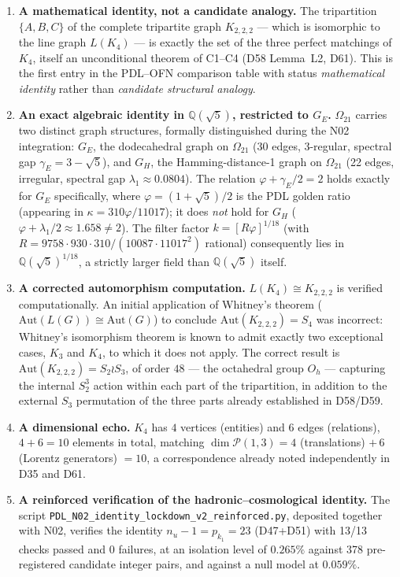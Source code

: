 \documentclass[11pt,a4paper]{article}
\theoremstyle{plain}
\theoremstyle{definition}
\theoremstyle{remark}
\newcommand{\Kfour}{K_4}
\begin{document}
\begin{enumerate}[label=(\roman*)]
\item \textbf{A mathematical identity, not a candidate analogy.} The tripartition $\{A,B,C\}$ of the complete tripartite graph $K_{2,2,2}$ --- which is isomorphic to the line graph $L(\Kfour)$ --- is exactly the set of the three perfect matchings of $\Kfour$, itself an unconditional theorem of C1--C4 (D58 Lemma~L2, D61). This is the first entry in the PDL--OFN comparison table with status \emph{mathematical identity} rather than \emph{candidate structural analogy}.
\item \textbf{An exact algebraic identity in $\mathbb{Q}(\sqrt{5})$, restricted to $G_E$.} $\Omega_{21}$ carries two distinct graph structures, formally distinguished during the N02 integration: $G_E$, the dodecahedral graph on $\Omega_{21}$ (30 edges, 3-regular, spectral gap $\gamma_E=3-\sqrt5$), and $G_H$, the Hamming-distance-1 graph on $\Omega_{21}$ (22 edges, irregular, spectral gap $\lambda_1\approx0.0804$). The relation $\varphi+\gamma_E/2=2$ holds exactly for $G_E$ specifically, where $\varphi=(1+\sqrt5)/2$ is the PDL golden ratio (appearing in $\kappa=310\varphi/11017$); it does \emph{not} hold for $G_H$ ($\varphi+\lambda_1/2\approx1.658\neq2$). The filter factor $k=[R\varphi]^{1/18}$ (with $R=9758\cdot930\cdot310/(10087\cdot11017^2)$ rational) consequently lies in $\mathbb{Q}(\sqrt{5})^{1/18}$, a strictly larger field than $\mathbb{Q}(\sqrt{5})$ itself.
\item \textbf{A corrected automorphism computation.} $L(\Kfour) \cong K_{2,2,2}$ is verified computationally. An initial application of Whitney's theorem ($\mathrm{Aut}(L(G))\cong\mathrm{Aut}(G)$) to conclude $\mathrm{Aut}(K_{2,2,2})=S_4$ was incorrect: Whitney's isomorphism theorem is known to admit exactly two exceptional cases, $K_3$ and $K_4$, to which it does not apply. The correct result is $\mathrm{Aut}(K_{2,2,2}) = S_2\wr S_3$, of order $48$ --- the octahedral group $O_h$ --- capturing the internal $S_2^3$ action within each part of the tripartition, in addition to the external $S_3$ permutation of the three parts already established in D58/D59.
\item \textbf{A dimensional echo.} $\Kfour$ has $4$ vertices (entities) and $6$ edges (relations), $4+6=10$ elements in total, matching $\dim\mathcal{P}(1,3) = 4$ (translations) $+\,6$ (Lorentz generators) $=10$, a correspondence already noted independently in D35 and D61.
\item \textbf{A reinforced verification of the hadronic--cosmological identity.} The script \texttt{PDL\_N02\_identity\_lockdown\_v2\_reinforced.py}, deposited together with N02, verifies the identity $n_u-1=p_{k_1}=23$ (D47+D51) with 13/13 checks passed and 0 failures, at an isolation level of $0.265\%$ against 378 pre-registered candidate integer pairs, and against a null model at $0.059\%$.

\end{enumerate}
\end{document}
